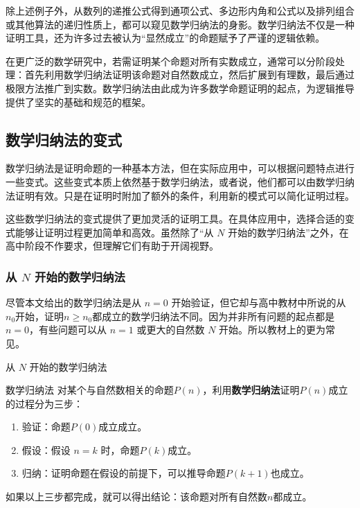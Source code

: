 除上述例子外，从数列的递推公式得到通项公式、多边形内角和公式以及排列组合或其他算法的递归性质上，都可以窥见数学归纳法的身影。数学归纳法不仅是一种证明工具，还为许多过去被认为“显然成立”的命题赋予了严谨的逻辑依赖。

在更广泛的数学研究中，若需证明某个命题对所有实数成立，通常可以分阶段处理：首先利用数学归纳法证明该命题对自然数成立，然后扩展到有理数，最后通过极限方法推广到实数。数学归纳法由此成为许多数学命题证明的起点，为逻辑推导提供了坚实的基础和规范的框架。

\subsection{数学归纳法的变式}

数学归纳法是证明命题的一种基本方法，但在实际应用中，可以根据问题特点进行一些变式。这些变式本质上依然基于数学归纳法，或者说，他们都可以由数学归纳法证明有效。只是在证明时附加了额外的条件，利用新的模式可以简化证明过程。

这些数学归纳法的变式提供了更加灵活的证明工具。在具体应用中，选择合适的变式能够让证明过程更加简单和高效。虽然除了“从 $N$ 开始的数学归纳法”之外，在高中阶段不作要求，但理解它们有助于开阔视野。

\subsubsection{从 $N$ 开始的数学归纳法}

尽管本文给出的数学归纳法是从 $n = 0$ 开始验证，但它却与高中教材中所说的从$n_0$开始，证明$n\geq n_0$都成立的数学归纳法不同。因为并非所有问题的起点都是 $n = 0$，有些问题可以从 $n = 1$ 或更大的自然数 $N$ 开始。所以教材上的更为常见。

\begin{definition}{从 $N$ 开始的数学归纳法}
\begin{definition}{数学归纳法}
对某个与自然数相关的命题$P(n)$，利用\textbf{数学归纳法}证明$P(n)$成立的过程分为三步：
\begin{enumerate}
\item 验证：命题$P(0)$成立成立。
\item 假设：假设 $n = k$ 时，命题$P(k)$成立。
\item 归纳：证明命题在假设的前提下，可以推导命题$P(k+1)$也成立。
\end{enumerate}
如果以上三步都完成，就可以得出结论：该命题对所有自然数$n$都成立。
\end{definition}
\end{definition}


